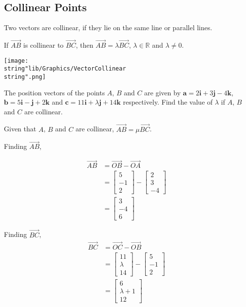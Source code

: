 \documentclass[11pt,a4paper]{book}
\newcommand{\R}{\mathbb{R}}
\begin{document}
\subsection{Collinear Points}

Two vectors are collinear, if they lie on the same line or parallel
lines.

If $\overrightarrow{AB}$ is collinear to $\overrightarrow{BC}$,
then $\overrightarrow{AB}=\lambda\overrightarrow{BC}$, $\lambda\in\R$
and $\lambda\neq0$.
\begin{center}
\texttt{[image: \\string"lib/Graphics/VectorCollinear\\string".png]}
\par\end{center}

\begin{example}

The position vectors of the points $A$, $B$ and $C$ are given by
$\textbf{a}=2\textbf{i}+3\textbf{j}-4\textbf{k}$, $\textbf{b}=5\textbf{i}-\textbf{j}+2\textbf{k}$
and $\textbf{c}=11\textbf{i}+\lambda\textbf{j}+14\textbf{k}$ respectively.
Find the value of $\lambda$ if $A$, $B$ and $C$ are collinear.

\Solution

Given that $A$, $B$ and $C$ are collinear, $\overrightarrow{AB}=\mu\overrightarrow{BC}$.

Finding $\overrightarrow{AB}$,

\begin{align*}
\overrightarrow{AB} & =\overrightarrow{OB}-\overrightarrow{OA}\\
 & =\begin{bmatrix}5\\
-1\\
2
\end{bmatrix}-\begin{bmatrix}2\\
3\\
-4
\end{bmatrix}\\
 & =\begin{bmatrix}3\\
-4\\
6
\end{bmatrix}
\end{align*}

Finding $\overrightarrow{BC}$,
\begin{align*}
\overrightarrow{BC} & =\overrightarrow{OC}-\overrightarrow{OB}\\
 & =\begin{bmatrix}11\\
\lambda\\
14
\end{bmatrix}-\begin{bmatrix}5\\
-1\\
2
\end{bmatrix}\\
 & =\begin{bmatrix}6\\
\lambda+1\\
12
\end{bmatrix}
\end{align*}


\end{example}
\end{document}
